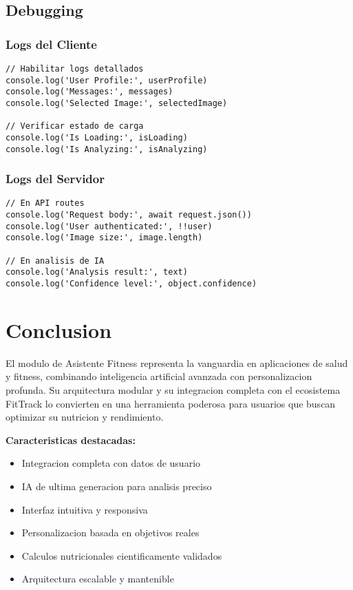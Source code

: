 \documentclass[12pt,a4paper]{article}
\begin{document}
\subsection{Debugging}

\subsubsection{Logs del Cliente}

\begin{lstlisting}[caption=Debugging en cliente]
// Habilitar logs detallados
console.log('User Profile:', userProfile)
console.log('Messages:', messages)
console.log('Selected Image:', selectedImage)

// Verificar estado de carga
console.log('Is Loading:', isLoading)
console.log('Is Analyzing:', isAnalyzing)
\end{lstlisting}

\subsubsection{Logs del Servidor}

\begin{lstlisting}[caption=Debugging en servidor]
// En API routes
console.log('Request body:', await request.json())
console.log('User authenticated:', !!user)
console.log('Image size:', image.length)

// En analisis de IA
console.log('Analysis result:', text)
console.log('Confidence level:', object.confidence)
\end{lstlisting}

\section{Conclusion}

El modulo de Asistente Fitness representa la vanguardia en aplicaciones de salud y fitness, combinando inteligencia artificial avanzada con personalizacion profunda. Su arquitectura modular y su integracion completa con el ecosistema FitTrack lo convierten en una herramienta poderosa para usuarios que buscan optimizar su nutricion y rendimiento.

\textbf{Caracteristicas destacadas:}
\begin{itemize}
    \item Integracion completa con datos de usuario
    \item IA de ultima generacion para analisis preciso
    \item Interfaz intuitiva y responsiva
    \item Personalizacion basada en objetivos reales
    \item Calculos nutricionales cientificamente validados
    \item Arquitectura escalable y mantenible
\end{itemize}
\end{document}
